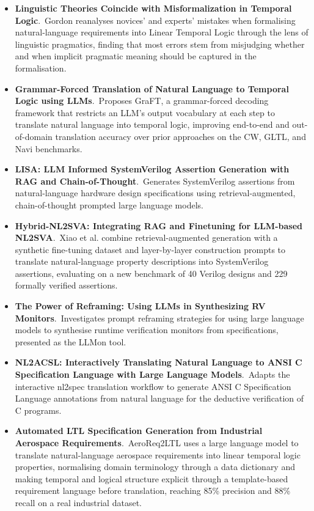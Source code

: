 \documentclass[natbib=false,acmsmall,nonacm,11pt]{acmart}
\begin{document}
\begin{itemize}
\item \textbf{Linguistic Theories Coincide with Misformalization in Temporal Logic}.~Gordon reanalyses novices' and experts' mistakes when formalising natural-language requirements into Linear Temporal Logic through the lens of linguistic pragmatics, finding that most errors stem from misjudging whether and when implicit pragmatic meaning should be captured in the formalisation.~\cite{DBLP:conf/kbse/Gordon25}
\item \textbf{Grammar-Forced Translation of Natural Language to Temporal Logic using LLMs}.~Proposes GraFT, a grammar-forced decoding framework that restricts an LLM's output vocabulary at each step to translate natural language into temporal logic, improving end-to-end and out-of-domain translation accuracy over prior approaches on the CW, GLTL, and Navi benchmarks.~\cite{pmlr-v267-english25a}
\item \textbf{LISA: LLM Informed SystemVerilog Assertion Generation with RAG and Chain-of-Thought}.~Generates SystemVerilog assertions from natural-language hardware design specifications using retrieval-augmented, chain-of-thought prompted large language models.~\cite{paul2025lisa}
\item \textbf{Hybrid-NL2SVA: Integrating RAG and Finetuning for LLM-based NL2SVA}.~Xiao et al. combine retrieval-augmented generation with a synthetic fine-tuning dataset and layer-by-layer construction prompts to translate natural-language property descriptions into SystemVerilog assertions, evaluating on a new benchmark of 40 Verilog designs and 229 formally verified assertions.~\cite{DBLP:conf/mlcad/XiaoEGK25}
\item \textbf{The Power of Reframing: Using LLMs in Synthesizing RV Monitors}.~Investigates prompt reframing strategies for using large language models to synthesise runtime verification monitors from specifications, presented as the LLMon tool.~\cite{DBLP:conf/rv/CohenHPG25}
\item \textbf{NL2ACSL: Interactively Translating Natural Language to ANSI C Specification Language with Large Language Models}.~Adapts the interactive nl2spec translation workflow to generate ANSI C Specification Language annotations from natural language for the deductive verification of C programs.~\cite{DBLP:journals/kbs/SuWZ26}
\item \textbf{Automated LTL Specification Generation from Industrial Aerospace Requirements}.~AeroReq2LTL uses a large language model to translate natural-language aerospace requirements into linear temporal logic properties, normalising domain terminology through a data dictionary and making temporal and logical structure explicit through a template-based requirement language before translation, reaching 85\% precision and 88\% recall on a real industrial dataset.~\cite{DBLP:conf/fm/MaLWCGQTY26}

\end{itemize}
\end{document}
